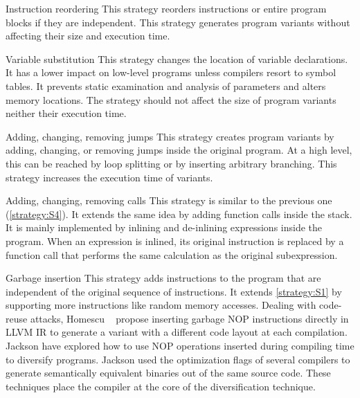 \begin{strategy}{Instruction reordering}
    \label{strategy:S2}
    \normalfont
    This strategy reorders instructions or entire program blocks if they are independent. This strategy generates program variants without affecting their size and execution time. 

\end{strategy}

\begin{strategy}{Variable substitution}
    \label{strategy:S3}
    \normalfont
    This strategy changes the location of variable declarations. It has a lower impact on low-level programs unless compilers resort to symbol tables. It prevents static examination and analysis of parameters and alters memory locations. The strategy should not affect the size of program variants neither their execution time.
\end{strategy}


\begin{strategy}{Adding, changing, removing jumps}
    \label{strategy:S4}
    \normalfont
    This strategy creates program variants by adding, changing, or removing jumps inside the original program. At a high level, this can be reached by loop splitting or by inserting arbitrary branching. This strategy increases the execution time of variants.
\end{strategy}


\begin{strategy}{Adding, changing, removing calls}
    \label{strategy:S5}
    \normalfont
    This strategy is similar to the previous one (\autoref{strategy:S4}). It extends the same idea by adding function calls inside the stack. It is mainly implemented by inlining and de-inlining expressions inside the program. When an expression is inlined, its original instruction is replaced by a function call that performs the same calculation as the original subexpression.
\end{strategy}


\begin{strategy}{Garbage insertion}
    \label{strategy:S6}
    \normalfont
    This strategy adds instructions to the program that are independent of the original sequence of instructions. It extends \autoref{strategy:S1} by supporting more instructions like random memory accesses.
    Dealing with code-reuse attacks, Homescu \etal~\cite{homescu2013profile} propose inserting garbage NOP instructions directly in LLVM IR to generate a variant with a different code layout at each compilation. 
    Jackson \etal \cite{jackson} have explored how to use NOP operations inserted during compiling time to diversify programs. Jackson \etal \cite{jackson}  used the optimization flags of several compilers to generate semantically equivalent binaries out of the same source code. These techniques place the compiler at the core of the diversification technique. %
\end{strategy}

